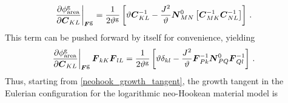\documentclass[10pt,letterpaper,oneside]{report}
\newcommand{\ten}[1]{\mbox{\boldmath $#1$}{}}
\newcommand{\scas}[1]{\mbox{{\scriptsize{${\rm{#1}}$}}}{}}
\newcommand{\tens}[1]{\mbox{\boldmath{\scriptsize{$#1$}}}{}}
\begin{document}
\begin{align}
\left. \frac{ \partial \phi^{\scas{g}}_{\scas{area}} }{ \partial \ten{C}_{KL} } \right|_{\tens{F}^{\scas{g}}} 
={}& \frac{1}{2 \vartheta^{\scas{g}}} \left[ \vartheta \ten{C}^{-1}_{KL} - \frac{J^2}{\vartheta} \ten{N}^0_{MN} \left[ \ten{C}^{-1}_{MK} \ten{C}^{-1}_{NL} \right] \right] \, .
\end{align}
This term can be pushed forward by itself for convenience, yielding
\begin{align}
\left. \frac{ \partial \phi^{\scas{g}}_{\scas{area}} }{ \partial \ten{C}_{KL} } \right|_{\tens{F}^{\scas{g}}} \ten{F}_{kK} \ten{F}_{lL} 
={}& \frac{1}{2 \vartheta^{\scas{g}}} \left[ \vartheta \delta_{kl} - \frac{J^2}{\vartheta} \ten{F}^{-1}_{Pk} \ten{N}^0_{PQ} \ten{F}^{-1}_{Ql} \right] \, . 
\label{growth_criterion_deriv_area}
\end{align}
Thus, starting from \autoref{neohook_growth_tangent}, the growth tangent in the Eulerian configuration for the logarithmic neo-Hookean material model is
\end{document}
